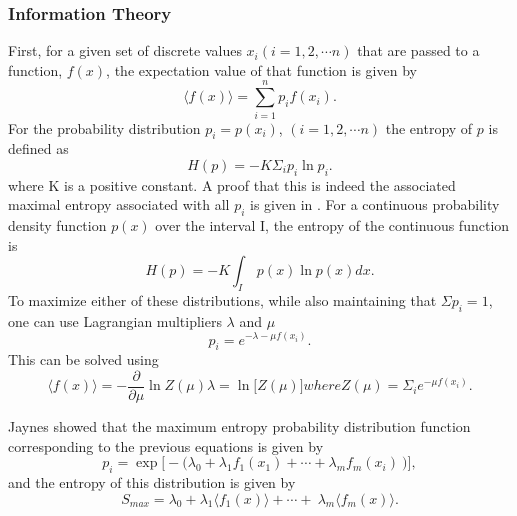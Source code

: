 \subsubsection*{Information Theory}

First, for a given set of discrete values $x_i (i=1,2, \cdots n)$
that are passed to a function, $f(x)$, the expectation value of that function is given
by
\begin{equation}
  \big\langle f(x) \big\rangle = \sum_{i=1}^n p_if(x_i).
\end{equation}
For the probability distribution $p_i = p(x_i)$, $(i=1,2, \cdots n)$ the entropy of
$p$ is defined as
\begin{equation}
  H(p) = - K \Sigma_i p_i \ln p_i .
  \label{eq:entropy}
\end{equation}
where K is a positive constant. A proof that this is indeed the associated
maximal entropy associated with all $p_i$ is given in
\cite{jaynes_information_1957}.
For a continuous probability density function $p(x)$ over the interval I, the
entropy of the continuous function is
\begin{equation}
  H(p) = - K \int_I\ p(x) \ln p(x) dx .
\end{equation}
To maximize either of these distributions, while also maintaining that $\Sigma
p_i = 1$, one can use Lagrangian multipliers $\lambda$ and $\mu$
\begin{equation}
  p_i = e^{-\lambda-\mu f(x_i)} .
\end{equation}
This can be solved using
\begin{subequations}
  \begin{equation}
    \big\langle f(x) \big\rangle = - \frac{\partial}{\partial \mu} \ln Z(\mu)
  \end{equation}
  \begin{equation}
    \lambda = \ln\big[Z(\mu)\big]
  \end{equation}
  where
  \begin{equation}
    Z(\mu) = \Sigma_i e^{-\mu f(x_i)} .
  \end{equation}
\end{subequations}

Jaynes \cite{jaynes_information_1957, jaynes_information_1957-1}
showed that the maximum
entropy probability distribution function corresponding to the previous
equations is given by
\begin{equation}
  p_i= \exp \big[ - \big( \lambda_0 + \lambda_1f_1(x_1) + \cdots + \lambda_m f_m(x_i) \
    \big) \big] ,
\end{equation}
and the entropy of this distribution is given by
\begin{equation}
  S_{max} = \lambda_0 + \lambda_1 \big\langle f_1 (x) \big\rangle + \cdots + \
  \lambda_m \big\langle f_m(x) \big\rangle .
\end{equation}


